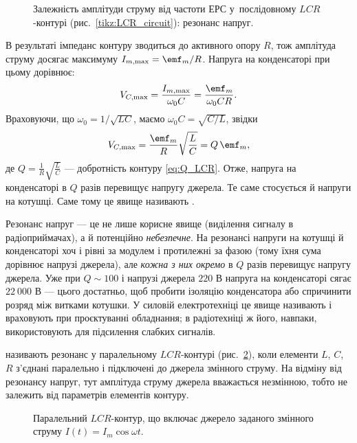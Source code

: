 \begin{figure}
	\centering
	\caption{Залежність амплітуди струму від частоти ЕРС у~послідовному $LCR$-контурі (рис.~\ref{tikz:LCR_circuit}): резонанс напруг.}
	\label{tikz:current_resonance}
\end{figure}

В результаті імпеданс контуру зводиться до активного опору $R$, тож амплітуда струму досягає максимуму $I_{m,\max} = \emf_m/R$. Напруга на конденсаторі при цьому дорівнює:
\begin{equation*}
	V_{C,\max} = \frac{I_{m,\max}}{\omega_0 C} = \frac{\emf_m}{\omega_0 C R}.
\end{equation*}
Враховуючи, що $\omega_0 = 1/\sqrt{LC}$, маємо $\omega_0 C = \sqrt{C/L}$, звідки
\begin{equation*}
	V_{C,\max} = \frac{\emf_m}{R}\sqrt{\frac{L}{C}} = Q\,\emf_m,
\end{equation*}
де $Q = \frac{1}{R}\sqrt{\frac{L}{C}}$ --- добротність контуру \eqref{eq:Q_LCR}. Отже, напруга на конденсаторі в $Q$ разів перевищує напругу джерела. Те саме стосується й напруги на котушці. Саме тому це явище називають .

\begin{Attention}
	Резонанс напруг --- це не лише корисне явище (виділення сигналу в радіоприймачах), а й потенційно \emph{небезпечне}. На резонансі напруги на котушці й конденсаторі хоч і рівні за модулем і протилежні за фазою (тому їхня сума дорівнює напрузі джерела), але \emph{кожна з них окремо} в $Q$ разів перевищує напругу джерела. Уже при $Q \sim 100$ і напрузі джерела $220$ В напруга на конденсаторі сягає $22\ 000$ В --- цього достатньо, щоб пробити ізоляцію конденсатора або спричинити розряд між витками котушки. У силовій електротехніці це явище називають  і враховують при проєктуванні обладнання; в радіотехніці ж його, навпаки, використовують для підсилення слабких сигналів.
\end{Attention}


 називають резонанс у паралельному $LCR$-контурі (рис.~\ref{tikz:parallel_circuit}), коли елементи $L$, $C$, $R$ з'єднані паралельно і підключені до джерела змінного струму. На відміну від резонансу напруг, тут амплітуда струму джерела вважається незмінною, тобто не залежить від параметрів елементів контуру.

\begin{figure}
	\centering
	\caption{Паралельний $LCR$-контур, що включає джерело заданого змінного струму $I(t) = I_m \cos\omega t$.}
	\label{tikz:parallel_circuit}
\end{figure}

